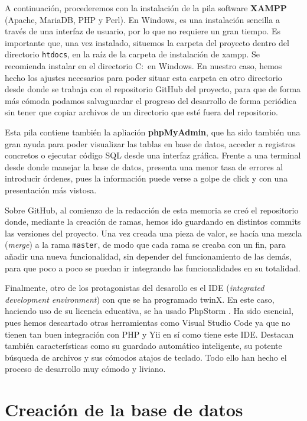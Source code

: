 A continuación, procederemos con la instalación de la pila software \textbf{XAMPP} (Apache, MariaDB, PHP y Perl). En Windows, es una instalación sencilla a través de una interfaz de usuario, por lo que no requiere un gran tiempo. Es importante que, una vez instalado, situemos la carpeta del proyecto dentro del directorio \texttt{htdocs}, en la raíz de la carpeta de instalación de xampp. Se recomienda instalar en el directorio C:\ en Windows. En nuestro caso, hemos hecho los ajustes necesarios para poder situar esta carpeta en otro directorio desde donde se trabaja con el repositorio GitHub del proyecto, para que de forma más cómoda podamos salvaguardar el progreso del desarrollo de forma periódica sin tener que copiar archivos de un directorio que esté fuera del repositorio.

Esta pila contiene también la apliación \textbf{phpMyAdmin}, que ha sido también una gran ayuda para poder visualizar las tablas en base de datos, acceder a registros concretos o ejecutar código SQL desde una interfaz gráfica. Frente a una terminal desde donde manejar la base de datos, presenta una menor tasa de errores al introducir órdenes, pues la información puede verse a golpe de click y con una presentación más vistosa.

Sobre GitHub, al comienzo de la redacción de esta memoria se creó el repositorio \cite{repogit} donde, mediante la creación de ramas, hemos ido guardando en distintos commits las versiones del proyecto. Una vez creada una pieza de valor, se hacía una mezcla (\textit{merge}) a la rama \texttt{master}, de modo que cada rama se creaba con un fin, para añadir una nueva funcionalidad, sin depender del funcionamiento de las demás, para que poco a poco se puedan ir integrando las funcionalidades en su totalidad.

Finalmente, otro de los protagonistas del desarollo es el IDE (\textit{integrated development environment}) con que se ha programado twinX. En este caso, haciendo uso de su licencia educativa, se ha usado PhpStorm \cite{phpstorm}. Ha sido esencial, pues hemos descartado otras herramientas como Visual Studio Code ya que no tienen tan buen integración con PHP y Yii en sí como tiene este IDE. Destacan también características como su guardado automático inteligente, su potente búsqueda de archivos y sus cómodos atajos de teclado. Todo ello han hecho el proceso de desarrollo muy cómodo y liviano.


\section{Creación de la base de datos}

